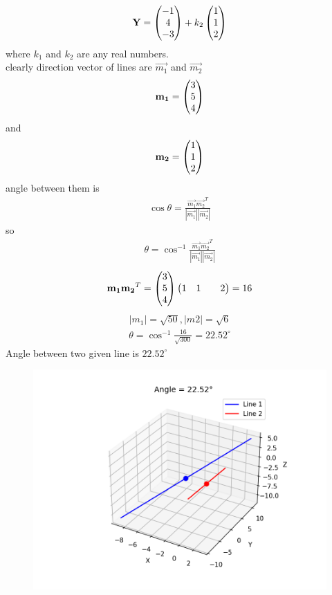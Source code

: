 \documentclass[12pt]{article}
\begin{document}
\begin{align}
    \Vec{Y} = \myvec{-1\\4\\-3} + k_2\myvec{1\\1\\2}
\end{align}
where $k_1$ and $k_2$ are any real numbers.\\
clearly direction vector of lines are $\vec{m_1}$ and $\vec{m_2}$
\begin{align}
    \mathbf{m_1}=\begin{pmatrix}3\\5\\4\end{pmatrix} 
\end{align}
and
\begin{align}
     \mathbf{m_2}=\begin{pmatrix}1\\1\\2\end{pmatrix}
\end{align}
angle between them is 
\begin{align}
    \cos{\theta}=\frac{\vec{m_1}\vec{m_2}^T}{|\vec{m_1}||\vec{m_2}|}
\end{align}
so 
\begin{align}
    \theta=\cos^{-1}{\frac{\vec{m_1}\vec{m_2}^T}{|\vec{m_1}||\vec{m_2}|}}
\end{align}
\begin{align}
    \mathbf{m_1}\mathbf{m_2}^T=\begin{pmatrix}3 \\ 5 \\ 4\end{pmatrix}\begin{pmatrix}1&1&&2\end{pmatrix}=16
\end{align}
\begin{align}
    |m_1|=\sqrt{50}, |m2|=\sqrt{6}
\end{align}
\begin{align}
    \theta=\cos^{-1}{\frac{16}{\sqrt{300}}}=22.52^{\circ}
    \end{align}
Angle between two given line is $22.52^{\circ}$
\begin{figure}[h]
    \centering
    \includegraphics[width=1.2\linewidth]{figures/lines3d.png}
    \caption{}
    \label{}
\end{figure}
\end{document}
